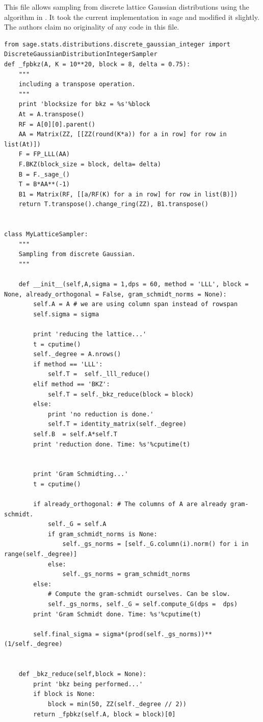 \documentclass[envcountsame]{llncs}
\begin{document}
\normalsize
This file allows sampling from discrete lattice Gaussian distributions using the algorithm in \cite{gentry2008trapdoors}.
It took the current implementation in sage and modified it slightly. The authors claim no originality of any code in this 
file.
\scriptsize
\begin{verbatim}
from sage.stats.distributions.discrete_gaussian_integer import DiscreteGaussianDistributionIntegerSampler
def _fpbkz(A, K = 10**20, block = 8, delta = 0.75):
    """
    including a transpose operation.
    """
    print 'blocksize for bkz = %s'%block
    At = A.transpose()
    RF = A[0][0].parent()
    AA = Matrix(ZZ, [[ZZ(round(K*a)) for a in row] for row in list(At)])
    F = FP_LLL(AA)
    F.BKZ(block_size = block, delta= delta)
    B = F._sage_()
    T = B*AA**(-1)
    B1 = Matrix(RF, [[a/RF(K) for a in row] for row in list(B)])
    return T.transpose().change_ring(ZZ), B1.transpose()


class MyLatticeSampler:
    """
    Sampling from discrete Gaussian.
    """

    def __init__(self,A,sigma = 1,dps = 60, method = 'LLL', block = None, already_orthogonal = False, gram_schmidt_norms = None):
        self.A = A # we are using column span instead of rowspan
        self.sigma = sigma

        print 'reducing the lattice...'
        t = cputime()
        self._degree = A.nrows()
        if method == 'LLL':
            self.T =  self._lll_reduce()
        elif method == 'BKZ':
            self.T = self._bkz_reduce(block = block)
        else:
            print 'no reduction is done.'
            self.T = identity_matrix(self._degree)
        self.B  = self.A*self.T
        print 'reduction done. Time: %s'%cputime(t)


        print 'Gram Schmidting...'
        t = cputime()

        if already_orthogonal: # The columns of A are already gram-schmidt.
            self._G = self.A
            if gram_schmidt_norms is None:
                self._gs_norms = [self._G.column(i).norm() for i in range(self._degree)]
            else:
                self._gs_norms = gram_schmidt_norms
        else:
            # Compute the gram-schmidt ourselves. Can be slow.
            self._gs_norms, self._G = self.compute_G(dps =  dps)
        print 'Gram Schmidt done. Time: %s'%cputime(t)

        self.final_sigma = sigma*(prod(self._gs_norms))**(1/self._degree)


    def _bkz_reduce(self,block = None):
        print 'bkz being performed...'
        if block is None:
            block = min(50, ZZ(self._degree // 2))
        return _fpbkz(self.A, block = block)[0]


\end{verbatim}
\end{document}
